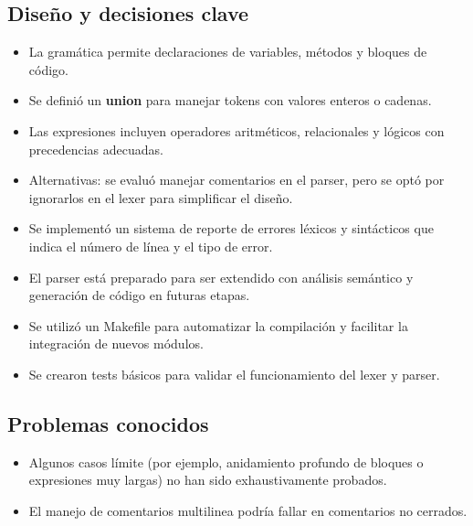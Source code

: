 \documentclass[12pt,a4paper]{article}
\begin{document}
\subsection*{Diseño y decisiones clave}
\begin{itemize}
    \item La gramática permite declaraciones de variables, métodos y bloques de código.
    \item Se definió un \textbf{union} para manejar tokens con valores enteros o cadenas.
    \item Las expresiones incluyen operadores aritméticos, relacionales y lógicos con precedencias adecuadas.
    \item Alternativas: se evaluó manejar comentarios en el parser, pero se optó por ignorarlos en el lexer para simplificar el diseño.
    \item Se implementó un sistema de reporte de errores léxicos y sintácticos que indica el número de línea y el tipo de error.
    \item El parser está preparado para ser extendido con análisis semántico y generación de código en futuras etapas.
    \item Se utilizó un Makefile para automatizar la compilación y facilitar la integración de nuevos módulos.
    \item Se crearon tests básicos para validar el funcionamiento del lexer y parser.
\end{itemize}

\subsection*{Problemas conocidos}
\begin{itemize}
    \item Algunos casos límite (por ejemplo, anidamiento profundo de bloques o expresiones muy largas) no han sido exhaustivamente probados.
    \item El manejo de comentarios multilinea podría fallar en comentarios no cerrados.
\end{itemize}
\end{document}
